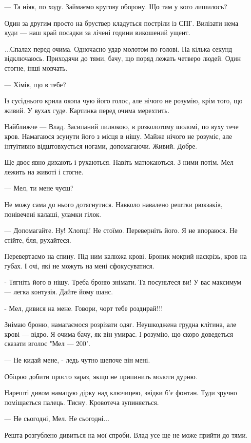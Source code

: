 — Та ніяк, по ходу. Займаємо кругову оборону. Що там у кого лишилось? 

Один за другим просто на бруствер кладуться постріли із СПГ.  Вилізати нема
куди — наш край посадки за лічені години викошений ущент.

...Спалах перед очима. Одночасно удар молотом по голові. На кілька секунд
відключаюсь. Приходячи до тями, бачу, що поряд лежать четверо людей. Один
стогне, інші мовчать. 

— Хімік, що в тебе?

Із сусіднього крила окопа чую його голос, але нічого не розумію, крім того, що
живий. У вухах гуде. Картинка перед очима мерехтить. 

Найближче  —     Влад. Засипаний пилюкою, в розколотому шоломі, по вуху тече
кров. Намагаюся зсунути його з місця в нішу. Майже нічого не розуміє, але
інтуїтивно відштовхується ногами, допомагаючи. Живий. Добре.

Ще двоє явно дихають і рухаються. Навіть матюкаються. З ними потім. Мел лежить
на животі і стогне. 

— Мел, ти мене чуєш? 

Не можу сама до нього дотягнутися. Навколо навалено рештки рюкзаків, понівечені
калаші, уламки гілок. 

— Допомагайте. Ну! Хлопці! Не стоїмо. Переверніть його. Я не впораюся. Не
стійте, бля, рухайтеся. 

Перевертаємо на спину. Під ним калюжа крові. Броник мокрий наскрізь, кров на
губах. І очі, які не можуть на мені сфокусуватися. 

- Тягніть  його в нішу. Треба броню знімати. Та посуньтеся ви! У вас максимум —
легка контузія. Дайте йому шанс. 

- Мел, дивися на мене. Говори, чорт тебе роздирай!!!

Знімаю броню, намагаємося розрізати одяг. Неушкоджена грудна клітина, але крові
— відро. Я очима бачу, як він умирає. І розумію, що скоро доведеться сказати
вголос "Мел — 200".  

— Не кидай мене,  - ледь чутно шепоче він мені. 

Обіцяю добити просто зараз, якщо не припинить молоти дурню. 

Нарешті дивом намацую дірку над ключицею, звідки б'є фонтан. Туди зручно
поміщається палець. Тисну. Кровотеча зупиняється. 

— Не сьогодні,  Мел. Не сьогодні...

Решта розгублено дивиться на мої спроби.  Влад усе ще не може прийти до тями. 


